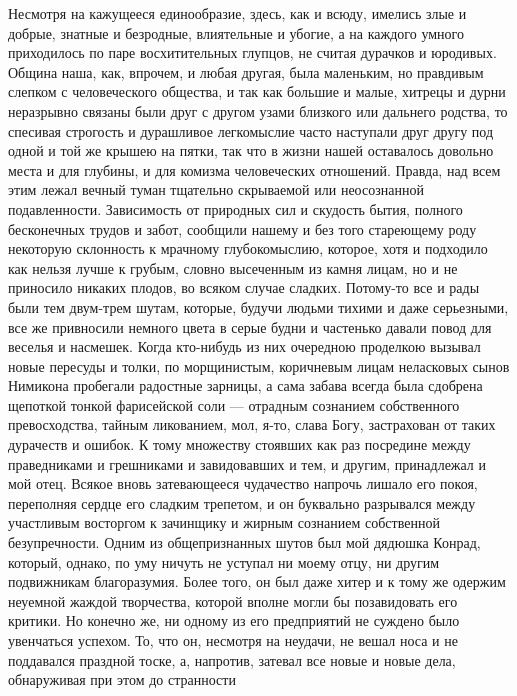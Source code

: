 Несмотря на кажущееся единообразие, здесь, как и всюду, имелись злые и
добрые, знатные и безродные, влиятельные и убогие, а на каждого умного
приходилось  по  паре восхитительных  глупцов,  не  считая дурачков  и
юродивых. Община наша,  как, впрочем, и любая  другая, была маленьким,
но правдивым  слепком с  человеческого общества, и  так как  большие и
малые, хитрецы  и дурни  неразрывно связаны были  друг с  другом узами
близкого  или дальнего  родства,  то спесивая  строгость и  дурашливое
легкомыслие часто  наступали друг другу под  одной и той же  крышею на
пятки, так что в жизни нашей  оставалось довольно места и для глубины,
и  для комизма  человеческих отношений.  Правда, над  всем этим  лежал
вечный  туман  тщательно  скрываемой или  неосознанной  подавленности.
Зависимость  от природных  сил и  скудость бытия,  полного бесконечных
трудов и забот,  сообщили нашему и без того  стареющему роду некоторую
склонность  к мрачному  глубокомыслию, которое,  хотя и  подходило как
нельзя  лучше к  грубым, словно  высеченным из  камня лицам,  но и  не
приносило никаких  плодов, во всяком  случае сладких. Потому-то  все и
рады  были  тем  двум-трем  шутам, которые,  будучи  людьми  тихими  и
даже  серьезными, все  же привносили  немного  цвета в  серые будни  и
частенько  давали  повод  для  веселья и  насмешек.  Когда  кто-нибудь
из  них  очередною  проделкою  вызывал  новые  пересуды  и  толки,  по
морщинистым,  коричневым  лицам  неласковых сынов  Нимикона  пробегали
радостные зарницы, а сама забава  всегда была сдобрена щепоткой тонкой
фарисейской  соли ---  отрадным сознанием  собственного превосходства,
тайным  ликованием,  мол,  я-то,  слава  Богу,  застрахован  от  таких
дурачеств и ошибок. К тому  множеству стоявших как раз посредине между
праведниками и грешниками и завидовавших  и тем, и другим, принадлежал
и  мой  отец.  Всякое  вновь затевающееся  чудачество  напрочь  лишало
его  покоя, переполняя  сердце его  сладким трепетом,  и он  буквально
разрывался между  участливым восторгом к зачинщику  и жирным сознанием
собственной  безупречности.  Одним  из общепризнанных  шутов  был  мой
дядюшка Конрад,  который, однако,  по уму ничуть  не уступал  ни моему
отцу,  ни другим  подвижникам благоразумия.  Более того,  он был  даже
хитер и к  тому же одержим неуемной жаждой  творчества, которой вполне
могли бы  позавидовать его критики.  Но конечно  же, ни одному  из его
предприятий не суждено  было увенчаться успехом. То,  что он, несмотря
на неудачи, не вешал носа и не поддавался праздной тоске, а, напротив,
затевал все  новые и  новые дела, обнаруживая  при этом  до странности
